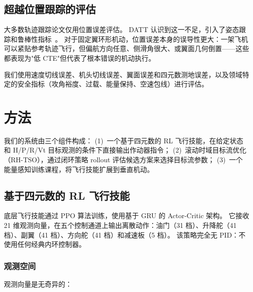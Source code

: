 \documentclass{article}
\begin{document}
\subsection{超越位置跟踪的评估}

大多数轨迹跟踪论文仅用位置误差评估。
DATT 认识到这一不足，引入了姿态跟踪和鲁棒性指标~\citep{huang2023datt}。
对于固定翼环形机动，位置误差本身的误导性更大：一架飞机可以紧贴参考轨迹飞行，但偏航方向任意、侧滑角很大、或翼面几何倒置——这些都表现为"低 CTE"但代表了根本错误的机动执行。

我们使用速度切线误差、机头切线误差、翼面误差和四元数测地误差，以及领域特定的安全指标（攻角裕度、过载、能量保持、空速包线）进行评估。


\section{方法}

我们的系统由三个组件构成：
(1)~一个基于四元数的 RL 飞行技能，在给定状态和 H/P/R/Vt 目标观测的条件下直接输出作动器指令；
(2)~滚动时域目标流优化（RH-TSO），通过闭环策略 rollout 评估候选方案来选择目标流参数；
(3)~一个能量感知训练课程，将飞行技能扩展到垂直机动。


\subsection{基于四元数的 RL 飞行技能}

底层飞行技能通过 PPO 算法训练，使用基于 GRU 的 Actor-Critic 架构。
它接收 21 维观测向量，在五个控制通道上输出离散动作：油门（31 档）、升降舵（41 档）、副翼（41 档）、方向舵（41 档）和减速板（5 档）。
该策略完全无 PID：不使用任何经典内环控制器。

\subsubsection{观测空间}

观测向量是无奇异的：
\end{document}
